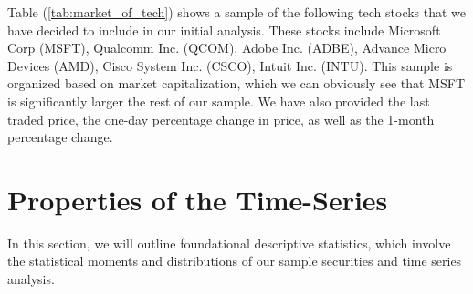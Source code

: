 \documentclass[12pt]{article}
\begin{document}
Table (\ref{tab:market_of_tech}) shows a sample of the following tech stocks that we have decided to include in our initial analysis. These stocks include Microsoft Corp (MSFT), Qualcomm Inc. (QCOM), Adobe Inc. (ADBE), Advance Micro Devices (AMD), Cisco System Inc. (CSCO), Intuit Inc. (INTU). This sample is organized based on market capitalization, which we can obviously see that MSFT is significantly larger the rest of our sample. We have also provided the last traded price, the one-day percentage change in price, as well as the 1-month percentage change.

\section{Properties of the Time-Series}

In this section, we will outline foundational descriptive statistics, which involve the statistical moments and distributions of our sample securities and time series analysis.
\end{document}
